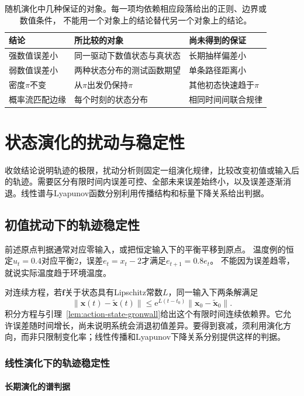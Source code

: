 \begin{table}[htbp]
 \centering
 \begin{tabularx}{\linewidth}{lXX}
 \toprule
 结论 & 所比较的对象 & 尚未得到的保证\\
 \midrule
 强数值误差小 & 同一驱动下数值状态与真状态 & 长期抽样偏差小\\
 弱数值误差小 & 两种状态分布的测试函数期望 & 单条路径距离小\\
 密度$\pi$不变 & 从$\pi$出发仍保持$\pi$ & 其他初态快速趋于$\pi$\\
 概率流匹配边缘 & 每个时刻的状态分布 & 相同时间间联合规律\\
 \bottomrule
 \end{tabularx}
 \caption{随机演化中几种保证的对象。每一项均依赖相应段落给出的正则、边界或数值条件，
 不能用一个对象上的结论替代另一个对象上的结论。}
 \label{tab:dynamical-path-distribution}
\end{table}

\section{状态演化的扰动与稳定性}
\label{sec:dynamical-stability-sensitivity}
收敛结论说明轨迹的极限，扰动分析则固定一组演化规律，比较改变初值或输入后的轨迹。需要区分有限时间内误差可控、全部未来误差始终小，以及误差逐渐消退。线性谱与Lyapunov函数分别利用传播结构和标量下降关系给出判据。

\subsection{初值扰动下的轨迹稳定性}
前述原点判据通常对应零输入，或把恒定输入下的平衡平移到原点。
温度例的恒定$u_t=0.4$对应平衡$2$，误差$e_t=x_t-2$才满足$e_{t+1}=0.8e_t$。
不能因为误差趋零，就说实际温度趋于环境温度。

对连续方程，若$\bm f$关于状态具有Lipschitz常数$L$，同一输入下两条解满足
\[
  \|\bm x(t)-\widetilde{\bm x}(t)\|
  \leq \mathrm e^{L(t-t_0)}\|\bm x_0-\widetilde{\bm x}_0\|.
\]
积分方程与引理~\ref{lem:action-state-gronwall}给出这个有限时间连续依赖界。它允许误差随时间增长，尚未说明系统会消退初值差异。要得到衰减，须利用演化方向，而非只限制变化率；线性传播和Lyapunov下降关系分别提供这样的判据。

\subsubsection{线性演化下的轨迹稳定性}
\paragraph{长期演化的谱判据}

